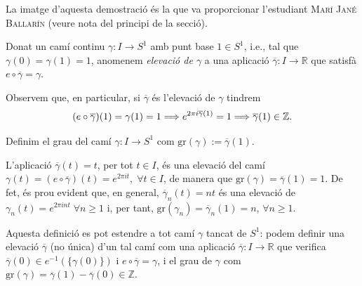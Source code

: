 \documentclass[../main.tex]{subfiles}
\begin{document}
La imatge d'aquesta demostració és la que va proporcionar l'estudiant \textsc{Marí Jané Ballarín} (veure nota del principi de la secció).


\begin{defi}
\label{def:elevaciodecamins} Donat un camí continu $\gamma:I\rightarrow S^1$ amb punt base $1\in S^1$, i.e., tal que $\gamma(0) = \gamma(1)=1$, anomenem \textit{elevació de $\gamma$} a una aplicació $\overline{\gamma}:I\rightarrow\mathbb{R}$ que satisfà $e\circ\overline{\gamma} = \gamma$.
\end{defi}

Observem que, en particular, si $\overline{\gamma}$ és l'elevació de $\gamma$ tindrem
\begin{equation}
    \notag
    (e\circ\overline{\gamma})(1)=\gamma(1) = 1\Longrightarrow e^{2\pi i\overline{\gamma}(1)} = 1\Longrightarrow \overline{\gamma}(1)\in\mathbb{Z}.
\end{equation}

\begin{defi}
\label{def:graudecami} Definim el grau del camí $\gamma:I\rightarrow S^1$ com $\mathrm{gr}(\gamma):=\overline{\gamma}(1)$.
\end{defi}



\begin{ej}
\label{ej:elevaciodecami} L'aplicació $\overline{\gamma}(t) = t$, per tot $t\in I$, és una elevació del camí $\gamma(t) = (e\circ\overline{\gamma})(t)=e^{2\pi it},\;\forall t\in I$, de manera que $\mathrm{gr}(\gamma) = \overline{\gamma}(1) = 1$. De fet, és prou evident que, en general, $\overline{\gamma}_n(t) = nt$ és una elevació de $\gamma_n(t) = e^{2\pi int}\;\forall n\geq 1$ i, per tant, $\mathrm{gr}(\gamma_n) = \overline{\gamma}_n(1) = n$, $\forall n\geq 1$.
\end{ej}

Aquesta definició es pot estendre a tot camí $\gamma$ tancat de $S^1$: podem definir una elevació $\overline{\gamma}$ (no única) d'un tal camí com una aplicació $\overline{\gamma}:I\rightarrow\mathbb{R}$ que verifica $\overline{\gamma}(0)\in e^{-1}(\{\gamma(0)\})$ i $e\circ \overline{\gamma}=\gamma$, i el grau de $\gamma$ com $\mathrm{gr}(\gamma)=\overline{\gamma}(1)-\overline{\gamma}(0)\in\mathbb{Z}$.
\end{document}
